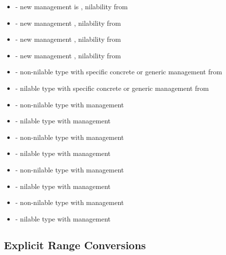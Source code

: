 \begin{itemize}
\item
{} - new management is , nilability from 

\item
{} - new management , nilability from 

\item
{} - new management , nilability from 

\item
{} - new management , nilability from 

\item
{} - non-nilable type with specific concrete or generic management from 

\item
{} - nilable type with specific concrete or generic management from 

\item
{} - non-nilable type with  management
\item
{} - nilable type with  management

\item
{} - non-nilable type with  management
\item
{} - nilable type with  management

\item
{} - non-nilable type with  management
\item
{} - nilable type with  management

\item
{} - non-nilable type with  management
\item
{} - nilable type with  management

\end{itemize}

\subsection{Explicit Range Conversions}
\label{Explicit_Range_Conversions}

